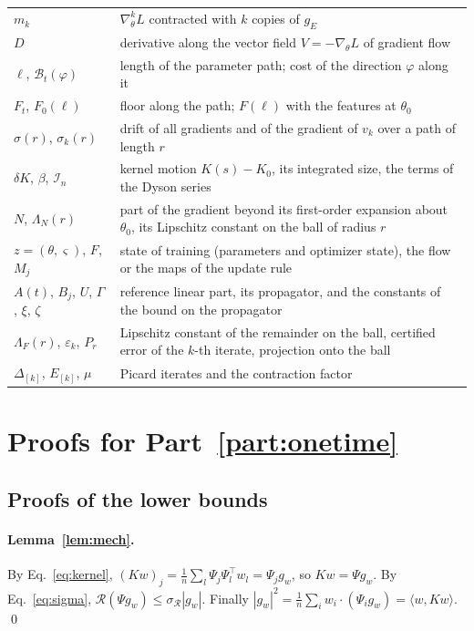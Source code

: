 \documentclass[11pt]{article}
\theoremstyle{definition}
\theoremstyle{remark}
\newcommand{\Rgh}{\mathcal{R}}           %
\newcommand{\sR}{\sigma_{\Rgh}}
\newcommand{\ip}[2]{\langle #1,#2\rangle}
\newcommand{\cost}{\mathcal{B}}          %
\begin{document}
\begin{table}[H]
\begin{tabular}{@{}p{}p{}@{}}
$m_k$ & $\nabla^k_\theta L$ contracted with $k$ copies of $g_E$ \\
$D$ & derivative along the vector field $V = -\nabla_\theta L$ of gradient flow \\
$\ell$, $\cost_t(\varphi)$ & length of the parameter path; cost of the direction $\varphi$ along it \\
$F_t$, $F_0(\ell)$ & floor along the path; $F(\ell)$ with the features at $\theta_0$ \\
$\sigma(r)$, $\sigma_k(r)$ & drift of all gradients and of the gradient of $v_k$ over a path of length $r$ \\
$\delta K$, $\beta$, $\mathcal{I}_n$ & kernel motion $K(s) - K_0$, its integrated size, the terms of the Dyson series \\
$N$, $\Lambda_N(r)$ & part of the gradient beyond its first-order expansion about $\theta_0$, its Lipschitz constant on the ball of radius $r$ \\
$z = (\theta,\varsigma)$, $F$, $M_j$ & state of training (parameters and optimizer state), the flow or the maps of the update rule \\
$A(t)$, $B_j$, $U$, $\Gamma$, $\xi$, $\zeta$ & reference linear part, its propagator, and the constants of the bound on the propagator \\
$\Lambda_F(r)$, $\varepsilon_k$, $P_r$ & Lipschitz constant of the remainder on the ball, certified error of the $k$-th iterate, projection onto the ball \\
$\Delta_{[k]}$, $E_{[k]}$, $\mu$ & Picard iterates and the contraction factor \\
\bottomrule
\end{tabular}
\end{table}

\section{Proofs for Part~\ref{part:onetime}}\label{app:proofs}

\subsection{Proofs of the lower bounds}\label{app:floor}

\paragraph{Lemma~\ref{lem:mech}.}
By Eq.~\eqref{eq:kernel}, $(Kw)_j = \tfrac1n\sum_l\Psi_j\Psi_l^\top w_l = \Psi_j g_w$, so $Kw = \Psi g_w$.
By Eq.~\eqref{eq:sigma}, $\Rgh(\Psi g_w) \le \sR|g_w|$.
Finally $|g_w|^2 = \tfrac1n\sum_i w_i\cdot(\Psi_i g_w) = \ip{w}{Kw}$. \qed
\end{document}
